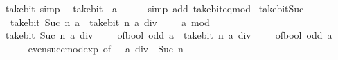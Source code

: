 \begin{isabellebody}
\endisatagproof
{\isafoldproof}%
%
\isadelimproof
\isanewline
%
\endisadelimproof
\isanewline
{}\isamarkupfalse%
\ take{\isacharunderscore}{\kern0pt}bit{\isacharunderscore}{\kern0pt}{}\ {\isacharbrackleft}{\kern0pt}simp{\isacharbrackright}{\kern0pt}{\isacharcolon}{\kern0pt}\isanewline
\ \ {\isachardoublequoteopen}take{\isacharunderscore}{\kern0pt}bit\ {}\ a\ {\isacharequal}{\kern0pt}\ {}{\isachardoublequoteclose}\isanewline
%
\isadelimproof
\ \ %
\endisadelimproof
%
\isatagproof
{}\isamarkupfalse%
\ {\isacharparenleft}{\kern0pt}simp\ add{\isacharcolon}{\kern0pt}\ take{\isacharunderscore}{\kern0pt}bit{\isacharunderscore}{\kern0pt}eq{\isacharunderscore}{\kern0pt}mod{\isacharparenright}{\kern0pt}%
\endisatagproof
{\isafoldproof}%
%
\isadelimproof
\isanewline
%
\endisadelimproof
\isanewline
{}\isamarkupfalse%
\ take{\isacharunderscore}{\kern0pt}bit{\isacharunderscore}{\kern0pt}Suc{\isacharcolon}{\kern0pt}\isanewline
\ \ {\isacartoucheopen}take{\isacharunderscore}{\kern0pt}bit\ {\isacharparenleft}{\kern0pt}Suc\ n{\isacharparenright}{\kern0pt}\ a\ {\isacharequal}{\kern0pt}\ take{\isacharunderscore}{\kern0pt}bit\ n\ {\isacharparenleft}{\kern0pt}a\ div\ {}{\isacharparenright}{\kern0pt}\ {\isacharasterisk}{\kern0pt}\ {}\ {\isacharplus}{\kern0pt}\ a\ mod\ {}{\isacartoucheclose}\isanewline
%
\isadelimproof
%
\endisadelimproof
%
\isatagproof
{}\isamarkupfalse%
\ {\isacharminus}{\kern0pt}\isanewline
\ \ \isamarkupfalse%
\ {\isacartoucheopen}take{\isacharunderscore}{\kern0pt}bit\ {\isacharparenleft}{\kern0pt}Suc\ n{\isacharparenright}{\kern0pt}\ {\isacharparenleft}{\kern0pt}a\ div\ {}\ {\isacharasterisk}{\kern0pt}\ {}\ {\isacharplus}{\kern0pt}\ of{\isacharunderscore}{\kern0pt}bool\ {\isacharparenleft}{\kern0pt}odd\ a{\isacharparenright}{\kern0pt}{\isacharparenright}{\kern0pt}\ {\isacharequal}{\kern0pt}\ take{\isacharunderscore}{\kern0pt}bit\ n\ {\isacharparenleft}{\kern0pt}a\ div\ {}{\isacharparenright}{\kern0pt}\ {\isacharasterisk}{\kern0pt}\ {}\ {\isacharplus}{\kern0pt}\ of{\isacharunderscore}{\kern0pt}bool\ {\isacharparenleft}{\kern0pt}odd\ a{\isacharparenright}{\kern0pt}{\isacartoucheclose}\isanewline
\ \ \ \ \isamarkupfalse%
\ even{\isacharunderscore}{\kern0pt}succ{\isacharunderscore}{\kern0pt}mod{\isacharunderscore}{\kern0pt}exp\ {\isacharbrackleft}{\kern0pt}of\ {\isacartoucheopen}{}\ {\isacharasterisk}{\kern0pt}\ {\isacharparenleft}{\kern0pt}a\ div\ {}{\isacharparenright}{\kern0pt}{\isacartoucheclose}\ {\isacartoucheopen}Suc\ n{\isacartoucheclose}{\isacharbrackright}{\kern0pt}\isanewline

\end{isabellebody}
